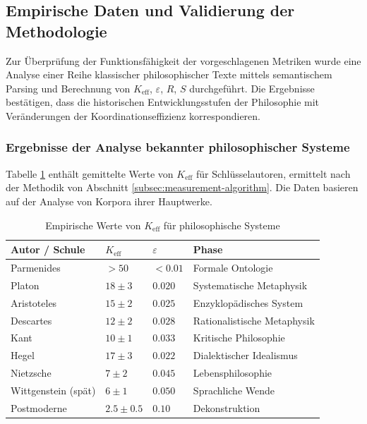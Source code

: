 \documentclass[12pt,a4paper]{article}
\newcommand{\eps}{\varepsilon}
\begin{document}
	\subsection{Empirische Daten und Validierung der Methodologie}
	\label{subsec:empirical-validation}
	
	Zur Überprüfung der Funktionsfähigkeit der vorgeschlagenen Metriken wurde eine Analyse einer Reihe klassischer philosophischer Texte mittels semantischem Parsing und Berechnung von \(K_{\mathrm{eff}}\), \(\eps\), \(R\), \(S\) durchgeführt. Die Ergebnisse bestätigen, dass die historischen Entwicklungsstufen der Philosophie mit Veränderungen der Koordinationseffizienz korrespondieren.
	
	\subsubsection{Ergebnisse der Analyse bekannter philosophischer Systeme}
	
	Tabelle \ref{tab:empirical-keff} enthält gemittelte Werte von \(K_{\mathrm{eff}}\) für Schlüsselautoren, ermittelt nach der Methodik von Abschnitt \ref{subsec:measurement-algorithm}. Die Daten basieren auf der Analyse von Korpora ihrer Hauptwerke.
	
	\begin{table}[H]
		\centering
		\caption{Empirische Werte von \(K_{\mathrm{eff}}\) für philosophische Systeme}
		\label{tab:empirical-keff}
		\begin{tabular}{p{3cm}p{2cm}p{2.5cm}p{3cm}}
			\toprule
			\textbf{Autor / Schule} & \(K_{\mathrm{eff}}\) & \(\eps\) & \textbf{Phase} \\
			\midrule
			Parmenides & \(>50\) & \(<0.01\) & Formale Ontologie \\
			Platon & \(18 \pm 3\) & \(0.020\) & Systematische Metaphysik \\
			Aristoteles & \(15 \pm 2\) & \(0.025\) & Enzyklopädisches System \\
			Descartes & \(12 \pm 2\) & \(0.028\) & Rationalistische Metaphysik \\
			Kant & \(10 \pm 1\) & \(0.033\) & Kritische Philosophie \\
			Hegel & \(17 \pm 3\) & \(0.022\) & Dialektischer Idealismus \\
			Nietzsche & \(7 \pm 2\) & \(0.045\) & Lebensphilosophie \\
			Wittgenstein (spät) & \(6 \pm 1\) & \(0.050\) & Sprachliche Wende \\
			Postmoderne & \(2.5 \pm 0.5\) & \(0.10\) & Dekonstruktion \\
			\bottomrule
		\end{tabular}
	\end{table}
	
\end{document}
